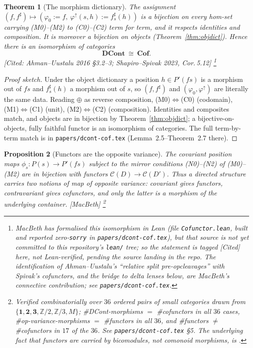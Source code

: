 \documentclass[11pt,a4paper]{book}
\newcommand{\Cof}{\mathbf{Cof}}
\newcommand{\DCont}{\mathbf{DCont}}
\theoremstyle{plain}
\newtheorem{Theorem}{Theorem}[chapter]
\newtheorem{Proposition}[Theorem]{Proposition}
\theoremstyle{definition}
\theoremstyle{remark}
\newcommand{\prov}[1]{\hfill\textsf{\footnotesize[#1]}}
\begin{document}
\begin{Theorem}[The morphism dictionary]\label{thm:dcontcof}
The assignment $(f,f^\sharp)\mapsto(\varphi_0:=f,\ \varphi^\uparrow(s,h):=f^\sharp_s(h))$
is a bijection on every hom-set carrying (M0)--(M2) to (C0)--(C2) term for term,
and it respects identities and composition. It is moreover a bijection on objects
(Theorem~\ref{thm:objdict}). Hence there is an isomorphism of categories
\[
  \DCont\ \cong\ \Cof .
\]
\prov{Cited: Ahman--Uustalu 2016 \S3.2--3; Shapiro--Spivak 2023, Cor.\,5.12}%
\footnote{MacBeth has formalised this isomorphism in Lean (file
\texttt{Cofunctor.lean}, built and reported zero-\texttt{sorry} in
\texttt{papers/dcont-cof.tex}), but that source is \emph{not yet committed} to
this repository's \texttt{lean/} tree; so the statement is tagged \textsf{[Cited]}
here, not \textsf{Lean-verified}, pending the source landing in the repo. The
\emph{identification} of Ahman--Uustalu's ``relative split pre-opcleavages'' with
Spivak's cofunctors, and the bridge to delta lenses below, are MacBeth's
connective contribution; see \texttt{papers/dcont-cof.tex}.}
\end{Theorem}

\begin{proof}[Proof sketch]
Under the object dictionary a position $h\in P'(fs)$ is a morphism out of $fs$ and
$f^\sharp_s(h)$ a morphism out of $s$, so $(f,f^\sharp)$ and
$(\varphi_0,\varphi^\uparrow)$ are literally the same data. Reading $\oplus$ as
reverse composition, (M0)$\Leftrightarrow$(C0) (codomain), (M1)$\Leftrightarrow$(C1)
(unit), (M2)$\Leftrightarrow$(C2) (composition). Identities and composites match,
and objects are in bijection by Theorem~\ref{thm:objdict}; a bijective-on-objects,
fully faithful functor is an isomorphism of categories. The full term-by-term
match is in \texttt{papers/dcont-cof.tex} (Lemma~2.5--Theorem~2.7 there).
\end{proof}

\begin{Proposition}[Functors are the opposite variance]\label{prop:cov}
The \emph{covariant} position maps $\phi_s\colon P(s)\to P'(fs)$ subject to the
mirror conditions (N0)--(N2) of (M0)--(M2) are in bijection with \emph{functors}
$\mathcal C(D)\to\mathcal C(D')$. Thus a directed structure carries two notions of
map of opposite variance: covariant gives functors, contravariant gives
cofunctors, and only the latter is a morphism of the underlying container.
\prov{MacBeth}%
\footnote{Verified combinatorially over $36$ ordered pairs of small categories
drawn from $\{\mathbf1,\mathbf2,\mathbf3,\mathbb Z/2,\mathbb Z/3,M\}$;
\#DCont-morphisms $=$ \#cofunctors in all $36$ cases, \#op-variance-morphisms $=$
\#functors in all $36$, and \#functors $\neq$ \#cofunctors in $17$ of the $36$.
See \texttt{papers/dcont-cof.tex} \S5. The underlying fact that functors are
carried by bicomodules, not comonoid morphisms, is \cite{SS23}.}
\end{Proposition}
\end{document}
